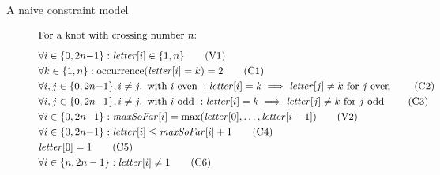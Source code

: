 \documentclass{beamer}
\newcommand{\letter}{\mathit{letter}}
\newcommand{\maxSoFar}{\mathit{maxSoFar}}
\newcommand{\occurrence}{\mathrm{occurrence}}
\begin{document}
\begin{frame}{A naive constraint model}
\begin{figure}[H]
\scriptsize{
\setlength{\abovedisplayskip}{0pt}
\setlength{\belowdisplayskip}{0pt}
\setlength{\abovecaptionskip}{0pt}
\begin{framed}
\begin{align*}
    \intertext{For a knot with crossing number $n$:\smallskip}
    &\forall i \in \{ 0, 2n {-} 1 \} : \letter [i] \in \{1, n \} \label{V1_letter} \tag{V1} \\
    &\forall k \in \{ 1, n \} : \occurrence (\letter [i] = k) = 2 \label{C1_occurrence} \tag{C1} \\
   	&\forall i, j \in \{ 0, 2n {-} 1 \}, i \neq j, \text{ with } i  \text{ even }: \letter [i] = k \implies \letter [j] \neq k \text{ for } j \text{ even } \label{C2_evenly_space} \tag{C2} \\ 
   	&\forall i, j \in \{ 0, 2n {-} 1 \}, i \neq j, \text{ with } i  \text{ odd }: \letter [i] = k \implies \letter [j] \neq k \text{ for } j \text{ odd } \label{C3_evenly_space} \tag{C3} \\ 
   	&\forall i \in \{ 0, 2n {-} 1 \} : \maxSoFar[i] = \max (\letter [0], \dots , \letter [i-1]) \label{V2_maxSoFar} \tag{V2} \\
   	&\forall i \in \{ 0, 2n {-} 1 \} : \letter [i] \leq \maxSoFar [i] + 1 \label{C4_symmetry} \tag{C4} \\
   	& \letter [0] = 1 \label{C5_start_with_1} \tag{C5} \\
   	&\forall i \in \{n, 2n - 1 \} : \letter [i] \neq  1 \label{C6_one_not_too_late} \tag{C6} 
    \end{align*}
\end{framed}
\label{model_naive}
}
\end{figure}
\end{frame}
\end{document}
